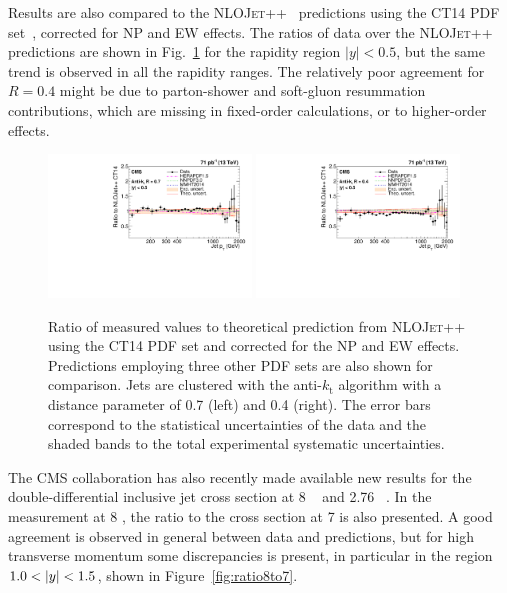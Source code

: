 \documentclass{PoS}
\providecommand{\NLOJETPP} {{\textsc{NLOJet++}}\xspace}
\providecommand{\kts}{\ensuremath{k_{\mathrm{t}}}\xspace}
\begin{document}
Results are also compared to the \NLOJETPP~\cite{Nagy:2003tz} predictions using the CT14 PDF set~\cite{Dulat:2015mca}, corrected for NP and EW effects.
The ratios of data over the \NLOJETPP predictions are shown in Fig.~\ref{fig:ratio_CT14} for the rapidity region
$|y|<0.5$, but the same trend is observed in all the rapidity ranges. The relatively poor agreement for $R = 0.4$ might
be due to parton-shower and soft-gluon resummation contributions, which are missing in fixed-order calculations, or to
higher-order effects. 

\begin{figure}[htbp]
  \includegraphics[width=0.48\textwidth]{Figure2-a.pdf}
  \includegraphics[width=0.48\textwidth]{Figure2-b.pdf}
  \caption{Ratio of measured values to theoretical prediction from \NLOJETPP using the CT14 PDF set and corrected for
the NP and EW effects. Predictions employing three other PDF sets are also shown for comparison. Jets are
clustered with the anti-\kts algorithm with a distance parameter of
0.7 (left) and 0.4 (right). The error bars correspond to the statistical
uncertainties of the data and the shaded bands to the total experimental systematic uncertainties.}
  \label{fig:ratio_CT14}
\end{figure}

The CMS collaboration has also recently made available new results for the double-differential inclusive jet cross section at 8
\TeV~\cite{CMS:2015haa} and 2.76 \TeV~\cite{Khachatryan:2015luy}. In the measurement at 8 \TeV, the ratio to the
cross section at 7 \TeV is also presented. A good agreement is observed in general between data and predictions, but for high
transverse momentum some discrepancies is present, in particular in the region $1.0 < \lvert y \rvert < 1.5$, shown in
Figure~\ref{fig:ratio8to7}.
\end{document}
